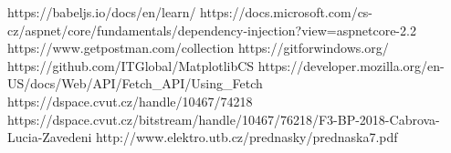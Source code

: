 \documentclass[FM,BP]{tulthesis}
\begin{document}
\begin{thebibliography}{Mm99}
    https://babeljs.io/docs/en/learn/
    https://docs.microsoft.com/cs-cz/aspnet/core/fundamentals/dependency-injection?view=aspnetcore-2.2
    https://www.getpostman.com/collection
    https://gitforwindows.org/
    https://github.com/ITGlobal/MatplotlibCS
    https://developer.mozilla.org/en-US/docs/Web/API/Fetch{\_}API/Using{\_}Fetch
    https://dspace.cvut.cz/handle/10467/74218
    https://dspace.cvut.cz/bitstream/handle/10467/76218/F3-BP-2018-Cabrova-Lucia-Zavedeni%
    http://www.elektro.utb.cz/prednasky/prednaska7.pdf 
\end{thebibliography}
\end{document}
